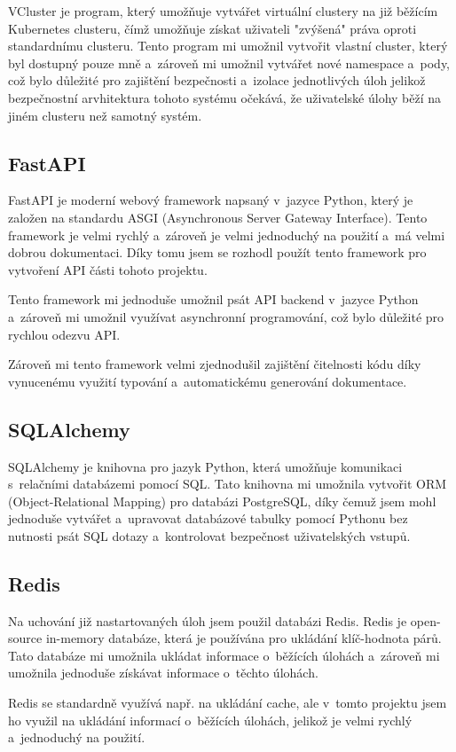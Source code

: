 \documentclass[12pt, a4paper,
oneside,      %
openright
]{report}
\begin{document}
VCluster je program, který umožňuje vytvářet virtuální clustery na již běžícím Kubernetes clusteru, čímž umožňuje získat uživateli "zvýšená" práva oproti standardnímu clusteru. Tento program mi umožnil vytvořit vlastní cluster, který byl dostupný pouze mně a~zároveň mi umožnil vytvářet nové namespace a~pody, což bylo důležité pro zajištění bezpečnosti a~izolace jednotlivých úloh jelikož bezpečnostní arvhitektura tohoto systému očekává, že uživatelské úlohy běží na jiném clusteru než samotný systém.

\subsection{FastAPI}
FastAPI je moderní webový framework napsaný v~jazyce Python, který je založen na standardu ASGI (Asynchronous Server Gateway Interface). Tento framework je velmi rychlý a~zároveň je velmi jednoduchý na použití a~má velmi dobrou dokumentaci. Díky tomu jsem se rozhodl použít tento framework pro vytvoření API části tohoto projektu.

Tento framework mi jednoduše umožnil psát API backend v~jazyce Python a~zároveň mi umožnil využívat asynchronní programování, což bylo důležité pro rychlou odezvu API.

Zároveň mi tento framework velmi zjednodušil zajištění čitelnosti kódu díky vynucenému využití typování a~automatickému generování dokumentace.

\subsection{SQLAlchemy}
SQLAlchemy je knihovna pro jazyk Python, která umožňuje komunikaci s~relačními databázemi pomocí SQL. Tato knihovna mi umožnila vytvořit ORM (Object-Relational Mapping) pro databázi PostgreSQL, díky čemuž jsem mohl jednoduše vytvářet a~upravovat databázové tabulky pomocí Pythonu bez nutnosti psát SQL dotazy a~kontrolovat bezpečnost uživatelských vstupů.

\subsection{Redis}
Na uchování již nastartovaných úloh jsem použil databázi Redis. Redis je open-source in-memory databáze, která je používána pro ukládání klíč-hodnota párů. Tato databáze mi umožnila ukládat informace o~běžících úlohách a~zároveň mi umožnila jednoduše získávat informace o~těchto úlohách.

Redis se standardně využívá např. na ukládání cache, ale v~tomto projektu jsem ho využil na ukládání informací o~běžících úlohách, jelikož je velmi rychlý a~jednoduchý na použití.
\end{document}
